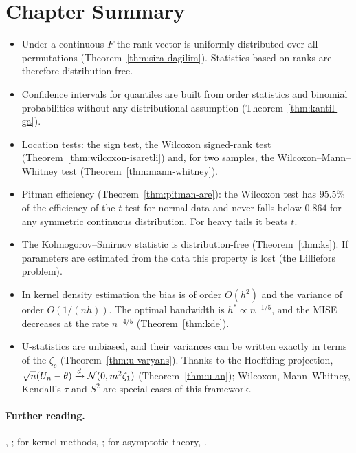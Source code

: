 \documentclass[main.tex]{subfiles}
\begin{document}
\section{Chapter Summary}
\begin{summary}
\begin{itemize}
  \item Under a continuous $F$ the rank vector is uniformly distributed over all permutations (Theorem~\ref{thm:sira-dagilim}). Statistics based on ranks are therefore distribution-free.
  \item Confidence intervals for quantiles are built from order statistics and binomial probabilities without any distributional assumption (Theorem~\ref{thm:kantil-ga}).
  \item Location tests: the sign test, the Wilcoxon signed-rank test (Theorem~\ref{thm:wilcoxon-isaretli}) and, for two samples, the Wilcoxon--Mann--Whitney test (Theorem~\ref{thm:mann-whitney}).
  \item Pitman efficiency (Theorem~\ref{thm:pitman-are}): the Wilcoxon test has $95.5\%$ of the efficiency of the $t$-test for normal data and never falls below $0.864$ for any symmetric continuous distribution. For heavy tails it beats $t$.
  \item The Kolmogorov--Smirnov statistic is distribution-free (Theorem~\ref{thm:ks}). If parameters are estimated from the data this property is lost (the Lilliefors problem).
  \item In kernel density estimation the bias is of order $O(h^2)$ and the variance of order $O(1/(nh))$. The optimal bandwidth is $h^*\propto n^{-1/5}$, and the MISE decreases at the rate $n^{-4/5}$ (Theorem~\ref{thm:kde}).
  \item U-statistics are unbiased, and their variances can be written exactly in terms of the $\zeta_c$ (Theorem~\ref{thm:u-varyans}). Thanks to the Hoeffding projection, $\sqrt n(U_n-\theta)\xrightarrow{d}\mathcal{N}(0,m^2\zeta_1)$ (Theorem~\ref{thm:u-an}); Wilcoxon, Mann--Whitney, Kendall's $\tau$ and $S^2$ are special cases of this framework.
\end{itemize}
\end{summary}

\paragraph{Further reading.} \cite{lehmann75}, \cite{wasserman06}; for kernel methods, \cite{silverman86}; for asymptotic theory, \cite[Chapters~13--14 and 19]{vdv}.
\end{document}
